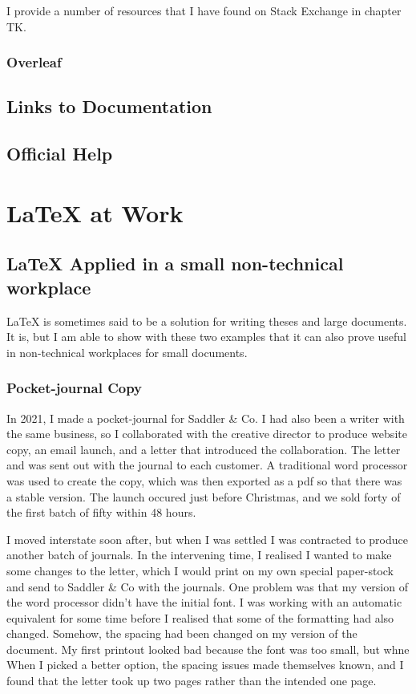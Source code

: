 \documentclass[12pt, oneside]{memoir}
\begin{document}
I provide a number of resources that I have found on Stack Exchange in chapter TK.

\subsection{Overleaf}

\section{Links to Documentation}

\section{Official Help}

\chapter{\LaTeX{} at Work}

\section{\LaTeX{} Applied in a small non-technical workplace}
\LaTeX{} is sometimes said to be a solution for writing theses and large documents. It is, but I am able to show with these two examples that it can also prove useful in non-technical workplaces for small documents.

\subsection{Pocket-journal Copy}
In 2021, I made a pocket-journal for Saddler \& Co. I had also been a writer with the same business, so I collaborated with the creative director to produce website copy, an email launch, and a letter that introduced the collaboration. The letter and was sent out with the journal to each customer. A traditional word processor was used to create the copy, which was then exported as a pdf so that there was a stable version. The launch occured just before Christmas, and we sold forty of the first batch of fifty within 48 hours.

I moved interstate soon after, but when I was settled I was contracted to produce another batch of journals. In the intervening time, I realised I wanted to make some changes to the letter, which I would print on my own special paper-stock and send to Saddler \& Co with the journals. One problem was that my version of the word processor didn't have the initial font. I was working with an automatic equivalent for some time before I realised that some of the formatting had also changed. Somehow, the spacing had been changed on my version of the document. My first printout looked bad because the font was too small, but whne When I picked a better option, the spacing issues made themselves known, and I found that the letter took up two pages rather than the intended one page.
\end{document}
